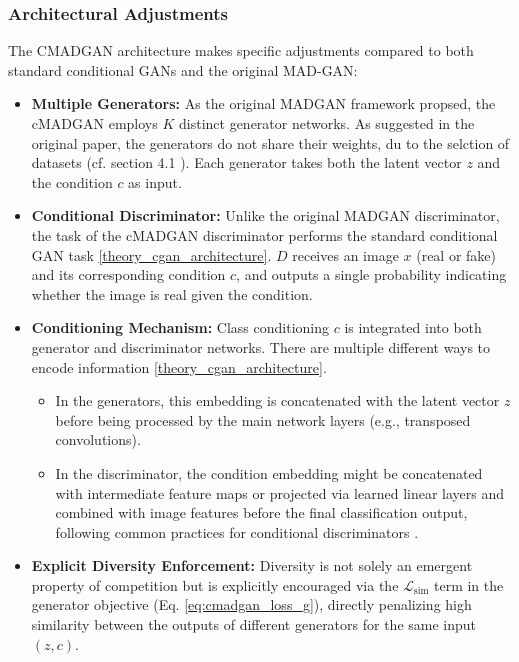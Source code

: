 \subsubsection{Architectural Adjustments}
\label{theory_cmadgan_architecture}

The CMADGAN architecture makes specific adjustments compared to both standard conditional GANs and the original MAD-GAN:

\begin{itemize}
    \item \textbf{Multiple Generators:} 
    As the original MADGAN framework propsed, the cMADGAN employs \(K\) distinct generator networks. As suggested in the original paper, the generators do not share their weights, du to the selction of datasets (cf. section 4.1 \cite{ghosh2018madgan}). Each generator takes both the latent vector \( z \) and the condition \( c \) as input.
    \item \textbf{Conditional Discriminator:} 
    Unlike the original MADGAN discriminator, the task of the cMADGAN discriminator performs the standard conditional GAN task \ref{theory_cgan_architecture}. \(D\) receives an image \( x \) (real or fake) and its corresponding condition \( c \), and outputs a single probability indicating whether the image is real given the condition.
    \item \textbf{Conditioning Mechanism:} Class conditioning \( c \) is integrated into both generator and discriminator networks. There are multiple different ways to encode information \ref{theory_cgan_architecture}. 
        \begin{itemize}
            \item In the generators, this embedding is concatenated with the latent vector \( z \) before being processed by the main network layers (e.g., transposed convolutions).
            \item In the discriminator, the condition embedding might be concatenated with intermediate feature maps or projected via learned linear layers and combined with image features before the final classification output, following common practices for conditional discriminators \cite{mirza2014conditionalgenerativeadversarialnets}.
        \end{itemize}
    \item \textbf{Explicit Diversity Enforcement:} Diversity is not solely an emergent property of competition but is explicitly encouraged via the \( \mathcal{L}_{\text{sim}} \) term in the generator objective (Eq. \ref{eq:cmadgan_loss_g}), directly penalizing high similarity between the outputs of different generators for the same input \( (z, c) \).
\end{itemize}

